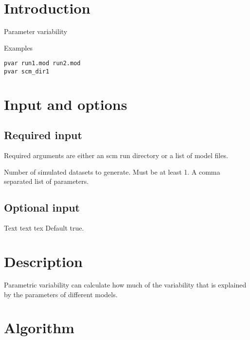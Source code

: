 



\maketitle


\section{Introduction}
Parameter variability

Examples
\begin{verbatim}
pvar run1.mod run2.mod
pvar scm_dir1
\end{verbatim}

\section{Input and options}

\subsection{Required input}
Required arguments are either an scm run directory or a list of model files.

\begin{optionlist}
Number of simulated datasets to generate. Must be at least 1.
\nextopt
{}
A comma separated list of parameters.
\nextopt
\end{optionlist}

\subsection{Optional input}

\begin{optionlist}
Text text tex
\nextopt
{}
Default true.
\nextopt
\end{optionlist}

\section{Description}

Parametric variability can calculate how much of the variability that is explained by the parameters of different models.

\section{Algorithm}

